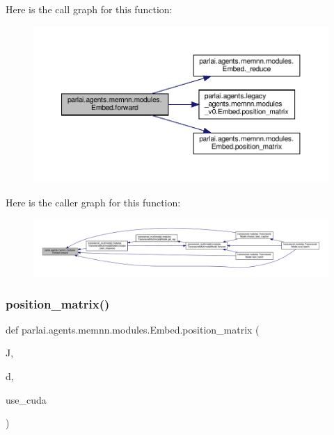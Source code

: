 Here is the call graph for this function\+:
\nopagebreak
\begin{figure}[H]
\begin{center}
\leavevmode
\includegraphics[width=350pt]{classparlai_1_1agents_1_1memnn_1_1modules_1_1Embed_a03a7701e101296fbbf28dcc05039c248_cgraph}
\end{center}
\end{figure}
Here is the caller graph for this function\+:
\nopagebreak
\begin{figure}[H]
\begin{center}
\leavevmode
\includegraphics[width=350pt]{classparlai_1_1agents_1_1memnn_1_1modules_1_1Embed_a03a7701e101296fbbf28dcc05039c248_icgraph}
\end{center}
\end{figure}
\mbox{\label{classparlai_1_1agents_1_1memnn_1_1modules_1_1Embed_aa6a44a42ac7d06f0f0598b7291d1dc58}} 
\subsubsection{\texorpdfstring{position\+\_\+matrix()}{position\_matrix()}}
{\footnotesize\ttfamily def parlai.\+agents.\+memnn.\+modules.\+Embed.\+position\+\_\+matrix (\begin{DoxyParamCaption}\item[{}]{J,  }\item[{}]{d,  }\item[{}]{use\+\_\+cuda }\end{DoxyParamCaption})}

